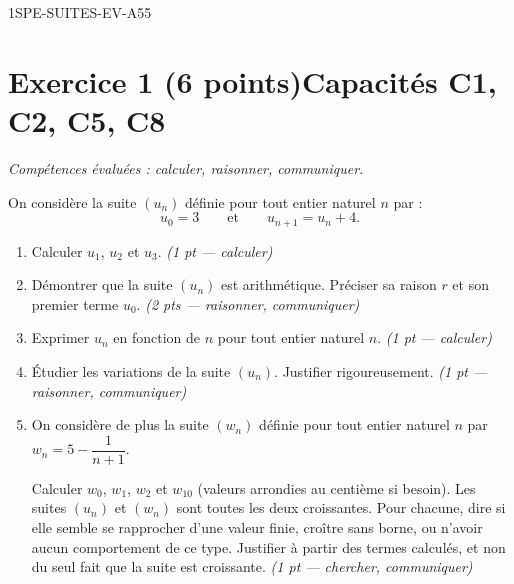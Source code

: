 
\begin{evaluation}{1SPE-SUITES-EV-A}{55}

\section*{Exercice 1 \ifnxVersionProfesseur\hfill (6 points)\fi \hfill Capacités C1, C2, C5, C8}

\textit{Compétences évaluées : calculer, raisonner, communiquer.}

\medskip
On considère la suite $(u_n)$ définie pour tout entier naturel $n$ par :
\[
  u_0 = 3 \qquad \text{et} \qquad u_{n+1} = u_n + 4.
\]

\begin{enumerate}
  \item Calculer $u_1$, $u_2$ et $u_3$.
  \ifnxVersionProfesseur\hfill\textit{(1 pt — calculer)}\fi

  \item Démontrer que la suite $(u_n)$ est arithmétique. Préciser sa raison $r$ et son premier terme $u_0$.
  \ifnxVersionProfesseur\hfill\textit{(2 pts — raisonner, communiquer)}\fi

  \item Exprimer $u_n$ en fonction de $n$ pour tout entier naturel $n$.
  \ifnxVersionProfesseur\hfill\textit{(1 pt — calculer)}\fi

  \item Étudier les variations de la suite $(u_n)$. Justifier rigoureusement.
  \ifnxVersionProfesseur\hfill\textit{(1 pt — raisonner, communiquer)}\fi

  \item On considère de plus la suite $(w_n)$ définie pour tout entier naturel $n$ par
    $w_n = 5 - \dfrac{1}{n+1}$.

    Calculer $w_0$, $w_1$, $w_2$ et $w_{10}$ (valeurs arrondies au centième si besoin).
    Les suites $(u_n)$ et $(w_n)$ sont toutes les deux croissantes. Pour chacune,
    dire si elle semble se rapprocher d'une valeur finie, croître sans borne, ou
    n'avoir aucun comportement de ce type. Justifier à partir des termes calculés,
    et non du seul fait que la suite est croissante.
  \ifnxVersionProfesseur\hfill\textit{(1 pt — chercher, communiquer)}\fi
\end{enumerate}


\end{evaluation}

